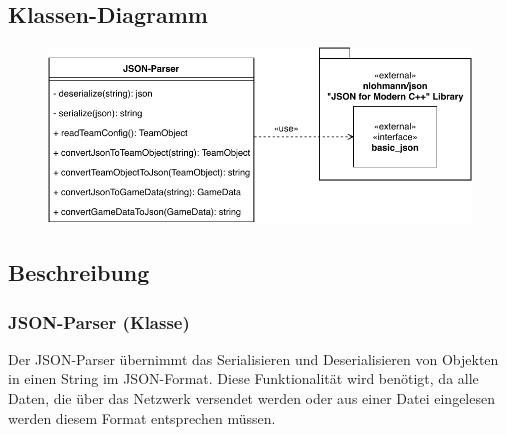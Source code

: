 \subsection{Klassen-Diagramm}
	\begin{figure}[H]
        \centering
        \includegraphics[scale=1]{images/JSON-Parser.pdf}
    \end{figure}

\subsection{Beschreibung}

	\subsubsection{JSON-Parser (Klasse)}
	
		Der JSON-Parser übernimmt das Serialisieren und Deserialisieren von Objekten in einen String im JSON-Format. Diese Funktionalität wird benötigt, da alle Daten, die über das Netzwerk versendet werden oder aus einer Datei eingelesen werden diesem Format entsprechen müssen.
	
